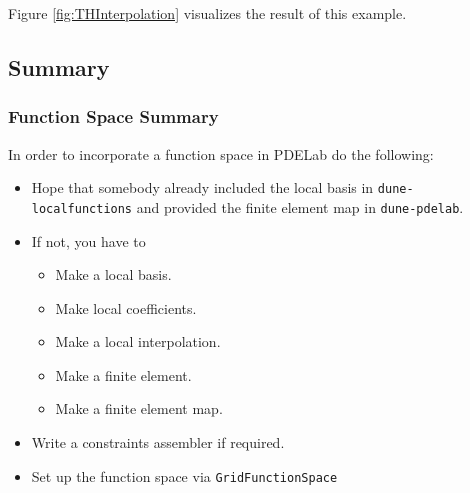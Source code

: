 Figure \ref{fig:THInterpolation} visualizes the result of this
example.

\subsection{Summary}

\begin{frame}
\frametitle<presentation>{Function Space Summary}
In order to incorporate a function space in PDELab do the following: 
\begin{itemize}
\item Hope that somebody already included the local basis
in \texttt{dune-localfunctions} and provided the finite element map
in \texttt{dune-pdelab}. 
\item If not, you have to
\begin{itemize}
\item Make a local basis.
\item Make local coefficients.
\item Make a local interpolation.
\item Make a finite element.
\item Make a finite element map.
\end{itemize}
\item Write a constraints assembler if required.
\item Set up the function space via \texttt{GridFunctionSpace}
\end{itemize}
\end{frame}

\cleardoublepage
